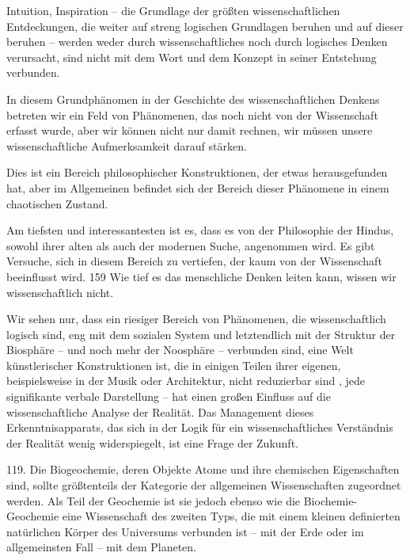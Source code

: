 \documentclass[11pt,a4paper]{book}
\begin{document}
Intuition, Inspiration -- die Grundlage der größten wissenschaftlichen Entdeckungen, die weiter auf streng logischen Grundlagen beruhen und auf dieser beruhen -- werden weder durch wissenschaftliches noch durch logisches Denken verursacht, sind nicht mit dem Wort und dem Konzept in seiner Entstehung verbunden.



In diesem Grundphänomen in der Geschichte des wissenschaftlichen Denkens betreten wir ein Feld von Phänomenen, das noch nicht von der Wissenschaft erfasst wurde, aber wir können nicht nur damit rechnen, wir müssen unsere wissenschaftliche Aufmerksamkeit darauf stärken.



Dies ist ein Bereich philosophischer Konstruktionen, der etwas herausgefunden hat, aber im Allgemeinen befindet sich der Bereich dieser Phänomene in einem chaotischen Zustand.



Am tiefsten und interessantesten ist es, dass es von der Philosophie der Hindus, sowohl ihrer alten als auch der modernen Suche, angenommen wird. Es gibt Versuche, sich in diesem Bereich zu vertiefen, der kaum von der Wissenschaft beeinflusst wird. 159 Wie tief es das menschliche Denken leiten kann, wissen wir wissenschaftlich nicht.



Wir sehen nur, dass ein riesiger Bereich von Phänomenen, die wissenschaftlich logisch sind, eng mit dem sozialen System und letztendlich mit der Struktur der Biosphäre -- und noch mehr der Noosphäre -- verbunden sind, eine Welt künstlerischer Konstruktionen ist, die in einigen Teilen ihrer eigenen, beispielsweise in der Musik oder Architektur, nicht reduzierbar sind , jede signifikante verbale Darstellung -- hat einen großen Einfluss auf die wissenschaftliche Analyse der Realität. Das Management dieses Erkenntnisapparats, das sich in der Logik für ein wissenschaftliches Verständnis der Realität wenig widerspiegelt, ist eine Frage der Zukunft.



119. Die Biogeochemie, deren Objekte Atome und ihre chemischen Eigenschaften sind, sollte größtenteils der Kategorie der allgemeinen Wissenschaften zugeordnet werden. Als Teil der Geochemie ist sie jedoch ebenso wie die Biochemie-Geochemie eine Wissenschaft des zweiten Typs, die mit einem kleinen definierten natürlichen Körper des Universums verbunden ist -- mit der Erde oder im allgemeinsten Fall -- mit dem Planeten.
\end{document}

